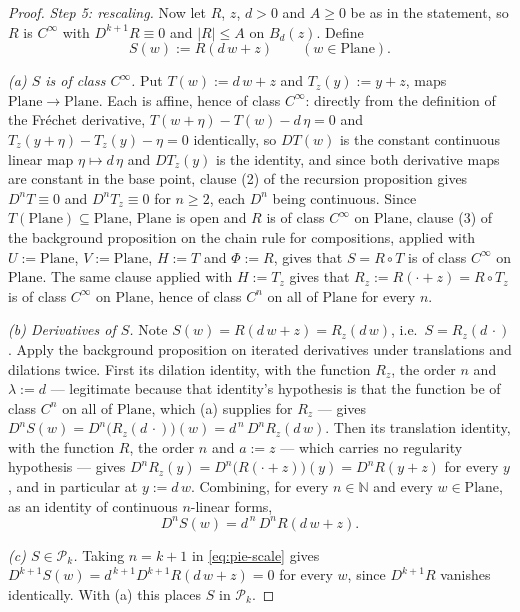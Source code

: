 \begin{proof}
\medskip\noindent\emph{Step 5: rescaling.}
Now let $R$, $z$, $d>0$ and $A\ge0$ be as in the statement, so $R$ is $C^\infty$ with
$D^{k+1}R\equiv0$ and $\lvert R\rvert\le A$ on $B_d(z)$.  Define
\[
  S(w):=R(d\,w+z)\qquad(w\in\mathrm{Plane}).
\]

\emph{(a) $S$ is of class $C^\infty$.}  Put $T(w):=d\,w+z$ and $T_z(y):=y+z$, maps
$\mathrm{Plane}\to\mathrm{Plane}$.  Each is affine, hence of class $C^{\infty}$: directly from
the definition of the Fr\'echet derivative, $T(w+\eta)-T(w)-d\,\eta=0$ and
$T_z(y+\eta)-T_z(y)-\eta=0$ identically, so $DT(w)$ is the constant continuous linear map
$\eta\mapsto d\,\eta$ and $DT_z(y)$ is the identity, and since both derivative maps are constant
in the base point, clause (2) of the recursion proposition gives $D^{n}T\equiv0$ and
$D^{n}T_z\equiv0$ for $n\ge2$, each $D^{n}$ being continuous.  Since
$T(\mathrm{Plane})\subseteq\mathrm{Plane}$, $\mathrm{Plane}$ is open and $R$ is of class
$C^{\infty}$ on $\mathrm{Plane}$, clause (3) of the background proposition on the chain rule for
compositions, applied with $U:=\mathrm{Plane}$, $V:=\mathrm{Plane}$, $H:=T$ and $\Phi:=R$, gives
that $S=R\circ T$ is of class $C^{\infty}$ on $\mathrm{Plane}$.  The same clause applied with
$H:=T_z$ gives that $R_z:=R(\cdot+z)=R\circ T_z$ is of class $C^{\infty}$ on $\mathrm{Plane}$,
hence of class $C^{n}$ on all of $\mathrm{Plane}$ for every $n$.

\emph{(b) Derivatives of $S$.}  Note $S(w)=R(d\,w+z)=R_z(d\,w)$, i.e.\ $S=R_z(d\,\cdot)$.  Apply
the background proposition on iterated derivatives under translations and dilations twice.  First
its dilation identity, with the function $R_z$, the order $n$ and $\lambda:=d$ --- legitimate
because that identity's hypothesis is that the function be of class $C^{n}$ on all of
$\mathrm{Plane}$, which (a) supplies for $R_z$ --- gives
$D^{n}S(w)=D^{n}\bigl(R_z(d\,\cdot)\bigr)(w)=d^{\,n}\,D^{n}R_z(d\,w)$.  Then its translation
identity, with the function $R$, the order $n$ and $a:=z$ --- which carries no regularity
hypothesis --- gives $D^{n}R_z(y)=D^{n}\bigl(R(\cdot+z)\bigr)(y)=D^{n}R(y+z)$ for every $y$, and
in particular at $y:=d\,w$.  Combining, for every $n\in\mathbb{N}$ and every
$w\in\mathrm{Plane}$, as an identity of continuous $n$-linear forms,
\begin{equation}\label{eq:pie-scale}
  D^{n}S(w)=d^{\,n}\,D^{n}R(d\,w+z).
\end{equation}

\emph{(c) $S\in\mathcal{P}_k$.}  Taking $n=k+1$ in \eqref{eq:pie-scale} gives
$D^{k+1}S(w)=d^{\,k+1}D^{k+1}R(d\,w+z)=0$ for every $w$, since $D^{k+1}R$ vanishes
identically.  With (a) this places $S$ in $\mathcal{P}_k$.


\end{proof}

